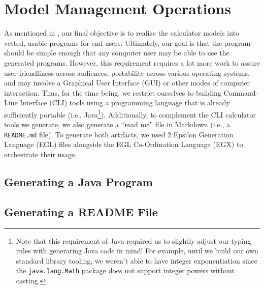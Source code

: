 \documentclass[11pt,fleqn]{article}
\begin{document}
\section{Model Management Operations}
\label{sec:model-management-operations}

As mentioned in , our final objective is
to realize the calculator models into vetted, usable programs for end users.
Ultimately, our goal is that the program should be simple enough that any
computer user may be able to use the generated programs. However, this
requirement requires a lot more work to assure user-friendliness across
audiences, portability across various operating systems, and may involve a
Graphical User Interface (GUI) or other modes of computer interaction. Thus, for
the time being, we restrict ourselves to building Command-Line Interface (CLI)
tools using a programming language that is already sufficiently portable (i.e.,
Java\footnote{Note that this requirement of Java required us to slightly adjust
our typing rules with generating Java code in mind! For example, until we build
our own standard library tooling, we weren't able to have integer exponentiation
since the \lstinline{java.lang.Math} package does not support integer powers
without casting.}). Additionally, to complement the CLI calculator tools we
generate, we also generate a ``read me'' file in Markdown (i.e., a
\lstinline{README.md} file). To generate both artifacts, we used 2 Epsilon
Generation Language (EGL) files alongside the EGL Co-Ordination Language (EGX)
to orchestrate their usage.

\subsection{Generating a Java Program}
\label{sec:model-management-operations:subsec:generating-a-java-program}

\subsection{Generating a README File}
\label{sec:model-management-operations:subsec:generating-a-readme-file}

\newpage{}

\end{document}
